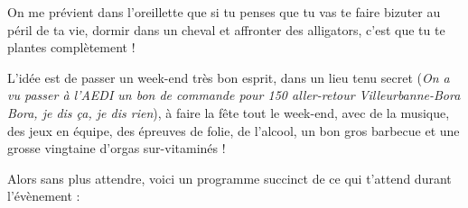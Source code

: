 On me prévient dans l'oreillette que si tu penses que tu vas te faire bizuter au
péril de ta vie, dormir dans un cheval et affronter des alligators, c'est que tu
te plantes complètement !

L'idée est de passer un week-end très bon esprit, dans un lieu tenu secret
(\emph{On a
vu passer à l'AEDI un bon de commande pour 150 aller-retour
Villeurbanne-Bora Bora, je dis ça, je dis rien}), à faire la fête tout le
week-end, avec de la musique, des jeux en équipe, des épreuves de folie, de
l'alcool, un bon gros barbecue et une grosse vingtaine d'orgas sur-vitaminés !

Alors sans plus attendre, voici un programme succinct de ce qui t'attend durant
l'évènement :
